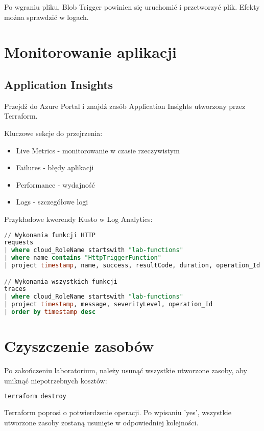 \documentclass{article}
\begin{document}
Po wgraniu pliku, Blob Trigger powinien się uruchomić i przetworzyć plik. Efekty można sprawdzić w logach.

\section{Monitorowanie aplikacji}

\subsection{Application Insights}

Przejdź do Azure Portal i znajdź zasób Application Insights utworzony przez Terraform.

Kluczowe sekcje do przejrzenia:
\begin{itemize}
    \item Live Metrics - monitorowanie w czasie rzeczywistym
    \item Failures - błędy aplikacji
    \item Performance - wydajność
    \item Logs - szczegółowe logi
\end{itemize}

Przykładowe kwerendy Kusto w Log Analytics:

\begin{lstlisting}[language=SQL]
// Wykonania funkcji HTTP
requests
| where cloud_RoleName startswith "lab-functions"
| where name contains "HttpTriggerFunction"
| project timestamp, name, success, resultCode, duration, operation_Id

// Wykonania wszystkich funkcji
traces
| where cloud_RoleName startswith "lab-functions"
| project timestamp, message, severityLevel, operation_Id
| order by timestamp desc
\end{lstlisting}

\section{Czyszczenie zasobów}

Po zakończeniu laboratorium, należy usunąć wszystkie utworzone zasoby, aby uniknąć niepotrzebnych kosztów:

\begin{lstlisting}[language=bash]
terraform destroy
\end{lstlisting}

Terraform poprosi o potwierdzenie operacji. Po wpisaniu 'yes', wszystkie utworzone zasoby zostaną usunięte w odpowiedniej kolejności.
\end{document}
